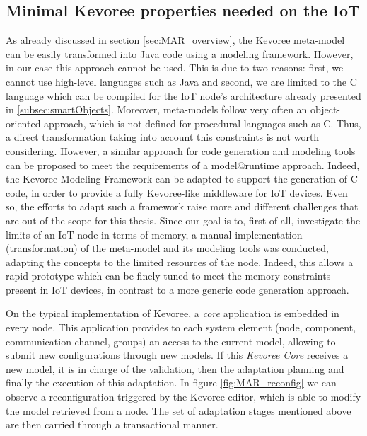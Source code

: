 \subsection{Minimal Kevoree properties needed on the IoT}
\label{subsec:minKevProp}
As already discussed in section \ref{sec:MAR_overview}, the Kevoree meta-model can be easily transformed into Java code using a modeling framework.
However, in our case this approach cannot be used.
This is due to two reasons: first, we cannot use high-level languages such as Java and second, we are limited to the C language which can be compiled for the IoT node's architecture already presented in \ref{subsec:smartObjects}.
Moreover, meta-models follow very often an object-oriented approach, which is not defined for procedural languages such as C.
Thus, a direct transformation taking into account this constraints is not worth considering.
However, a similar approach for code generation and modeling tools can be proposed to meet the requirements of a model@runtime approach.
Indeed, the Kevoree Modeling Framework\cite{fouquet2012eclipse} can be adapted to support the generation of C code, in order to provide a fully Kevoree-like middleware for IoT devices.
Even so, the efforts to adapt such a framework raise more and different challenges that are out of the scope for this thesis.
Since our goal is to, first of all, investigate the limits of an IoT node in terms of memory, a manual implementation (transformation) of the meta-model and its modeling tools was conducted, adapting the concepts to the limited resources of the node.
Indeed, this allows a rapid prototype which can be finely tuned to meet the memory constraints present in IoT devices, in contrast to a more generic code generation approach.

On the typical implementation of Kevoree, a \textit{core} application is embedded in every node. 
This application provides to each system element (node, component, communication channel, groups) an access to the current model, allowing to submit new configurations through new models.
If this \textit{Kevoree Core} receives a new model, it is in charge of the validation, then the adaptation planning and finally the execution of this adaptation.
In figure \ref{fig:MAR_reconfig} we can observe a reconfiguration triggered by the Kevoree editor, which is able to modify the model retrieved from a node.  The set of adaptation stages mentioned above are then carried through a transactional manner.

